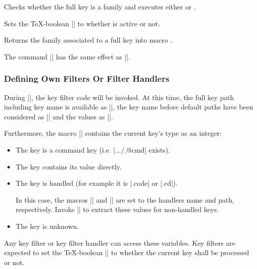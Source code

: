 \begin{command}{\pgfkeysiffamilydefined{}}%
    Checks whether the full key  is a family and executes either
     or .
\end{command}

\begin{command}{\pgfkeysisfamilyactive{}}
    Sets the \TeX-boolean |\ifpgfkeysfiltercontinue| to whether 
    is active or not.
\end{command}

\begin{command}{\pgfkeysgetfamily{}}
    Returns the family associated to a full key  into macro
    .
\end{command}

\begin{command}{\pgfkeyssetfamily{}}
    The command |\pgfkeyssetfamily| has the same
    effect as ||.
\end{command}


\subsubsection{Defining Own Filters Or Filter Handlers}
\label{section-key-writing-filters}

During |\pgfkeysfiltered|, the key filter code will be invoked. At this time,
the full key path including key name is available as |\pgfkeyscurrentkey|, the
key name before default paths have been considered as |\pgfkeyscurrentkeyRAW|
and the values as |\pgfkeyscurrentvalue|.

Furthermore, the macro |\pgfkeyscasenumber| contains the current key's type as
an integer:
%
\begin{itemize}
    \item[\meta{1}] The key is a command key (i.e. |.../.@cmd| exists).
    \item[\meta{2}] The key contains its value directly.
    \item[\meta{3}] The key is handled (for example it is |.code| or |.cd|).

        In this case, the macros |\pgfkeyscurrentname| and
        |\pgfkeyscurrentpath| are set to the handlers name and path,
        respectively. Invoke |\pgfkeyssplitpath{}| to extract these values for
        non-handled keys.
    \item[\meta{0}] The key is unknown.
\end{itemize}
%
Any key filter or key filter handler can access these variables. Key filters
are expected to set the \TeX-boolean |\ifpgfkeysfiltercontinue| to whether the
current key shall be processed or not.

